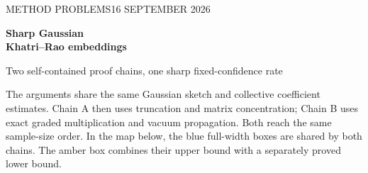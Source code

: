 \documentclass[11pt]{article}
\numberwithin{equation}{section}
\theoremstyle{definition}\newtheorem{definition}[theorem]{Definition}
\theoremstyle{remark}\newtheorem{remark}[theorem]{Remark}
\begin{document}
\thispagestyle{empty}
{\sffamily\color{Navy}\small METHOD PROBLEMS\hfill 16 SEPTEMBER 2026\par}
\vspace{3mm}
{\sffamily\bfseries\fontsize{25}{29}\selectfont Sharp Gaussian\\Khatri--Rao embeddings\par}
\vspace{2mm}
{\sffamily\large Two self-contained proof chains, one sharp fixed-confidence rate\par}
\vspace{3mm}
The arguments share the same Gaussian sketch and collective coefficient estimates.
Chain A then uses truncation and matrix concentration; Chain B uses exact graded
multiplication and vacuum propagation. Both reach the same sample-size order.
In the map below, the blue full-width boxes are shared by both chains.
The amber box combines their upper bound with a separately proved lower bound.
\vspace{2mm}
\end{document}
